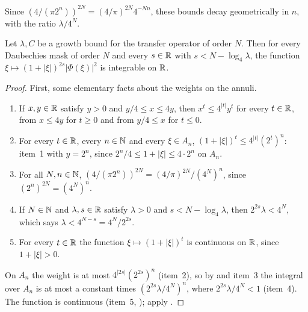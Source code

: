 Since $(4/(\pi 2^n))^{2N} = (4/\pi)^{2N} 4^{-Nn}$, these bounds decay geometrically in $n$, with
the ratio $\lambda/4^N$.

\begin{theorem}
\label{thm:daub-decay-l2}
\leanok
{}
Let $\lambda, C$ be a growth bound for the transfer operator of order $N$. Then for every
Daubechies mask of order $N$ and every $s \in \mathbb{R}$ with $s < N - \log_4 \lambda$, the function
$\xi \mapsto (1 + |\xi|)^{2s} |\Phi(\xi)|^2$ is integrable on $\mathbb{R}$.
\end{theorem}

\begin{proof}
\leanok
{}
First, some elementary facts about the weights on the annuli.
\begin{enumerate}
  \item If $x, y \in \mathbb{R}$ satisfy $y > 0$ and $y/4 \leq x \leq 4y$, then $x^t \leq 4^{|t|} y^t$
    for every $t \in \mathbb{R}$, from $x \leq 4y$ for $t \geq 0$ and from $y/4 \leq x$ for $t \leq 0$.
  \item For every $t \in \mathbb{R}$, every $n \in \mathbb{N}$ and every $\xi \in A_n$,
    $(1 + |\xi|)^t \leq 4^{|t|} (2^t)^n$: item~1 with $y = 2^n$, since
    $2^n/4 \leq 1 + |\xi| \leq 4 \cdot 2^n$ on $A_n$.
  \item For all $N, n \in \mathbb{N}$, $(4/(\pi 2^n))^{2N} = (4/\pi)^{2N}/(4^N)^n$, since
    $(2^n)^{2N} = (4^N)^n$.
  \item If $N \in \mathbb{N}$ and $\lambda, s \in \mathbb{R}$ satisfy $\lambda > 0$ and
    $s < N - \log_4 \lambda$, then $2^{2s} \lambda < 4^N$, which says
    $\lambda < 4^{N-s} = 4^N/2^{2s}$.
  \item For every $t \in \mathbb{R}$ the function $\xi \mapsto (1 + |\xi|)^t$ is continuous on $\mathbb{R}$,
    since $1 + |\xi| > 0$.
\end{enumerate}
On $A_n$ the weight is at most $4^{|2s|} (2^{2s})^n$ (item~2), so by
 and item~3 the integral over $A_n$ is at most a constant
times $(2^{2s} \lambda/4^N)^n$, where $2^{2s} \lambda/4^N < 1$ (item~4). The function is
continuous (item~5, ); apply
.
\end{proof}

